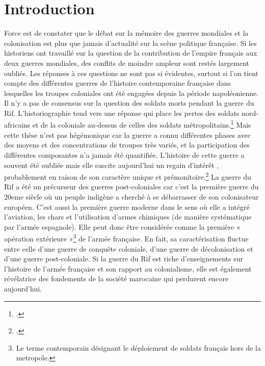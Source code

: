 \part*{Introduction}
Force est de constater que le débat sur la mémoire des guerres mondiales et la colonisation est plus que jamais d’actualité sur la scène politique française. Si les historiens ont travaillé sur la question de la contribution de l'empire français aux deux guerres mondiales, des conflits de moindre ampleur sont restés largement oubliés. Les réponses à ces questions ne sont pas si évidentes, surtout si l'on tient compte des différentes guerres de l’histoire contemporaine française dans lesquelles les  troupes coloniales ont été engagées depuis la période napoléonienne. Il n'y a pas de consensus sur  la question des soldats morts pendant la guerre du Rif. L’historiographie tend vers une réponse qui place les pertes des soldats nord-africains et de la coloniale au-dessus de celles des soldats métropolitains.\footcites{schiavon2016} Mais cette thèse n’est pas hégémonique car la guerre a connu différentes phases avec des moyens et des concentrations de troupes très variés, et la participation des différentes composantes n'a jamais été quantifiée. L’histoire de cette guerre a souvent été oubliée mais elle suscite aujourd'hui un regain d'intérêt , probablement en raison de son caractère unique et prémonitoire.\footcites{marly2021} La guerre du Rif a été un précurseur des guerres post-coloniales car c'est  la première guerre du 20eme siècle où un peuple indigène a cherché  à se débarrasser de son colonisateur européen. C'est aussi  la première guerre moderne dans le sens où elle a intégré  l’aviation, les chars et l'utilisation d'armes  chimiques (de manière systématique  par l’armée espagnole). Elle peut donc  être considérée comme la première « opération extérieure »\footnote{Le terme contemporain désignant le déploiement de soldats français hors de la metropole.} de l’armée française. En fait, sa caractérisation fluctue entre celle d’une guerre de conquête coloniale, d’une guerre de décolonisation et d’une guerre post-coloniale. Si la guerre du Rif est riche d'enseignements sur l'histoire de l'armée française et son rapport au colonialisme, elle est également révélatrice des fondements de la société marocaine qui perdurent encore aujourd'hui.\\  

